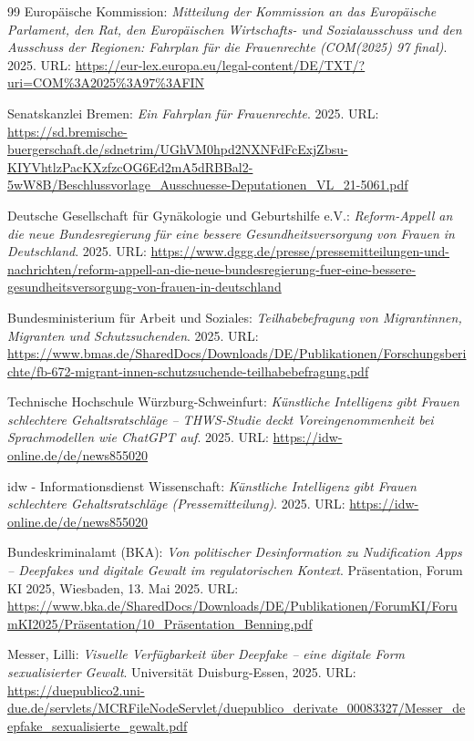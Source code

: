 \documentclass[12pt,a4paper]{article}
\begin{document}
\begin{thebibliography}{99}
		Europäische Kommission: \emph{Mitteilung der Kommission an das Europäische Parlament, den Rat, den Europäischen Wirtschafts- und Sozialausschuss und den Ausschuss der Regionen: Fahrplan für die Frauenrechte (COM(2025) 97 final)}. 2025.
		URL: \url{https://eur-lex.europa.eu/legal-content/DE/TXT/?uri=COM\%3A2025\%3A97\%3AFIN}
		
		Senatskanzlei Bremen: \emph{Ein Fahrplan für Frauenrechte}. 2025.
		URL: \url{https://sd.bremische-buergerschaft.de/sdnetrim/UGhVM0hpd2NXNFdFcExjZbsu-KIYVhtlzPacKXzfzcOG6Ed2mA5dRBBal2-5wW8B/Beschlussvorlage_Ausschuesse-Deputationen_VL_21-5061.pdf}
		
		Deutsche Gesellschaft für Gynäkologie und Geburtshilfe e.V.: \emph{Reform-Appell an die neue Bundesregierung für eine bessere Gesundheitsversorgung von Frauen in Deutschland}. 2025.
		URL: \url{https://www.dggg.de/presse/pressemitteilungen-und-nachrichten/reform-appell-an-die-neue-bundesregierung-fuer-eine-bessere-gesundheitsversorgung-von-frauen-in-deutschland}
		
		Bundesministerium für Arbeit und Soziales: \emph{Teilhabebefragung von Migrantinnen, Migranten und Schutzsuchenden}. 2025.
		URL: \url{https://www.bmas.de/SharedDocs/Downloads/DE/Publikationen/Forschungsberichte/fb-672-migrant-innen-schutzsuchende-teilhabebefragung.pdf}
		
		Technische Hochschule Würzburg-Schweinfurt: \emph{Künstliche Intelligenz gibt Frauen schlechtere Gehaltsratschläge – THWS-Studie deckt Voreingenommenheit bei Sprachmodellen wie ChatGPT auf}. 2025.
		URL: \url{https://idw-online.de/de/news855020}
		
		idw - Informationsdienst Wissenschaft: \emph{Künstliche Intelligenz gibt Frauen schlechtere Gehaltsratschläge (Pressemitteilung)}. 2025.
		URL: \url{https://idw-online.de/de/news855020}
		
		Bundeskriminalamt (BKA): \emph{Von politischer Desinformation zu Nudification Apps – Deepfakes und digitale Gewalt im regulatorischen Kontext}. Präsentation, Forum KI 2025, Wiesbaden, 13. Mai 2025.
		URL: \url{https://www.bka.de/SharedDocs/Downloads/DE/Publikationen/ForumKI/ForumKI2025/Präsentation/10_Präsentation_Benning.pdf}
		
		Messer, Lilli: \emph{Visuelle Verfügbarkeit über Deepfake – eine digitale Form sexualisierter Gewalt}. Universität Duisburg-Essen, 2025.
		URL: \url{https://duepublico2.uni-due.de/servlets/MCRFileNodeServlet/duepublico_derivate_00083327/Messer_deepfake_sexualisierte_gewalt.pdf}
		

\end{thebibliography}
\end{document}
